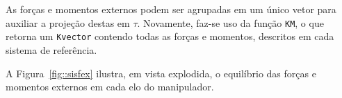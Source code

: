 \medskip {} \\
		  \\
		  \bigskip

		 
As forças e momentos externos podem ser agrupadas em um único vetor para
auxiliar a projeção destas em $\tau$. Novamente, faz-se uso da função
\texttt{KM}, o que retorna um \texttt{Kvector} contendo todas as forças e
momentos, descritos em cada sistema de referência.

\bigskip {} \bigskip

A Figura~\ref{fig::sisfex} ilustra, em vista explodida, o equilíbrio das forças e
momentos externos em cada elo do manipulador.


